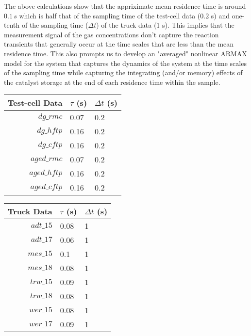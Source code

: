 The above calculations show that the appriximate mean residence time is around $0.1 \, s$ which is half that of the
sampling time of the test-cell data (0.2 s) and one-tenth of the sampling time ($\Delta t$) of the truck data (1 s).
This implies that the measurement signal of the gas concentrations don't capture the reaction transients that generally
occur at the time scales  that are less than the mean residence time. This also prompts us to develop an "averaged"
nonlinear ARMAX model for the system that captures the dynamics of the system at the time scales of the sampling time
while capturing the integrating (and/or memory) effects of the catalyst storage at the end of each residence time within
the sample.
\begin{table}[H]
\caption{Mean residence time of individual data sets}
\begin{minipage}{0.49\textwidth}
\begin{table}[H]
    \centering
    \begin{tabular}{r l l}
        \hline
        \hline
        \textbf{Test-cell Data} & \textbf{$\tau$ (s)} & \textbf{$\Delta t$ (s)}\\
        \hline
        \hline
        $dg\_rmc$ & 0.07 & 0.2\\
        $dg\_hftp$ & 0.16 & 0.2\\
        $dg\_cftp$ & 0.16 & 0.2\\
        $aged\_rmc$ & 0.07 & 0.2\\
        $aged\_hftp$ & 0.16 & 0.2\\
        $aged\_cftp$ & 0.16 & 0.2\\
        \hline
        \hline
    \end{tabular}
\end{table}
\end{minipage}
\begin{minipage}{0.49\textwidth}
\begin{table}[H]
    \centering
    \begin{tabular}{r l l}
        \hline
        \hline
        \textbf{Truck Data} & \textbf{$\tau$ (s)} & \textbf{$\Delta t$ (s)}\\
        \hline
        \hline
        $adt\_15$ & 0.08 & 1\\
        $adt\_17$ & 0.06 & 1\\
        $mes\_15$ & 0.1 & 1\\
        $mes\_18$ & 0.08 & 1\\
        $trw\_15$ & 0.09 & 1\\
        $trw\_18$ & 0.08 & 1\\
        $wer\_15$ & 0.08 & 1\\
        $wer\_17$ & 0.09 & 1\\
        \hline
        \hline
    \end{tabular}
\end{table}
\end{minipage}
\end{table}
